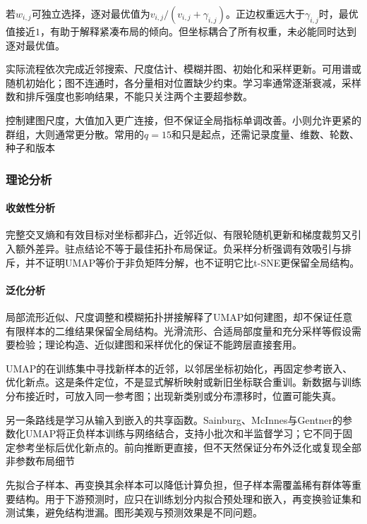 若$w_{i,j}$可独立选择，逐对最优值为$v_{i,j}/(v_{i,j}+\gamma_{i,j})$。正边权重远大于$\gamma_{i,j}$时，最优值接近$1$，有助于解释紧凑布局的倾向。但坐标耦合了所有权重，未必能同时达到逐对最优值。

实际流程依次完成近邻搜索、尺度估计、模糊并图、初始化和采样更新。可用谱或随机初始化；图不连通时，各分量相对位置缺少约束。学习率通常逐渐衰减，采样数和排斥强度也影响结果，不能只关注两个主要超参数。

控制建图尺度，大值加入更广连接，但不保证全局指标单调改善。小则允许更紧的群组，大则通常更分散。常用的$q=15$和只是起点，还需记录度量、维数、轮数、种子和版本

\subsubsection{理论分析}
\label{sec:dim-umap-theory}

\paragraph{收敛性分析}

完整交叉熵和有效目标对坐标都非凸，近邻近似、有限轮随机更新和梯度裁剪又引入额外差异。驻点结论不等于最佳拓扑布局保证。负采样分析强调有效吸引与排斥，并不证明UMAP等价于非负矩阵分解，也不证明它比t-SNE更保留全局结构。

\paragraph{泛化分析}

局部流形近似、尺度调整和模糊拓扑拼接解释了UMAP如何建图，却不保证任意有限样本的二维结果保留全局结构。光滑流形、合适局部度量和充分采样等假设需要检验；理论构造、近似建图和采样优化的保证不能跨层直接套用。

UMAP的在训练集中寻找新样本的近邻，以邻居坐标初始化，再固定参考嵌入、优化新点。这是条件定位，不是显式解析映射或新旧坐标联合重训。新数据与训练分布接近时，可放入同一参考图；出现新类别或分布漂移时，位置可能失真。

另一条路线是学习从输入到嵌入的共享函数。Sainburg、McInnes与Gentner的参数化UMAP将正负样本训练与网络结合，支持小批次和半监督学习；它不同于固定参考坐标后优化新点的。前向推断更直接，但不天然保证分布外泛化或复现全部非参数布局细节

先拟合子样本、再变换其余样本可以降低计算负担，但子样本需覆盖稀有群体等重要结构。用于下游预测时，应只在训练划分内拟合预处理和嵌入，再变换验证集和测试集，避免结构泄漏。图形美观与预测效果是不同问题。

